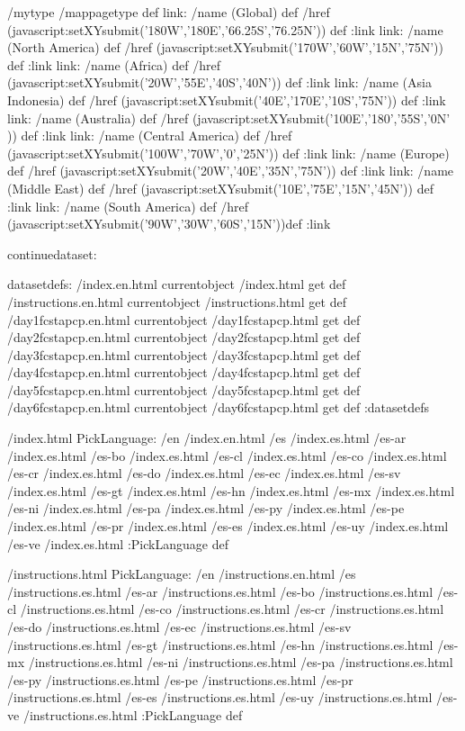 \begin{ingrid}
/mytype /mappagetype def
link:
/name (Global) def
/href (javascript:setXYsubmit('180W','180E','66.25S','76.25N')) def
:link
link:
/name (North America) def
/href (javascript:setXYsubmit('170W','60W','15N','75N')) def
:link
link:
/name (Africa) def
/href (javascript:setXYsubmit('20W','55E','40S','40N')) def
:link
link:
/name (Asia Indonesia) def
/href (javascript:setXYsubmit('40E','170E','10S','75N')) def
:link
link:
/name (Australia) def
/href (javascript:setXYsubmit('100E','180','55S','0N' )) def
:link
link:
/name (Central America) def
/href (javascript:setXYsubmit('100W','70W','0','25N')) def
:link
link:
/name (Europe) def
/href (javascript:setXYsubmit('20W','40E','35N','75N')) def
:link
link:
/name (Middle East) def
/href (javascript:setXYsubmit('10E','75E','15N','45N')) def
:link
link:
/name (South America) def
/href (javascript:setXYsubmit('90W','30W','60S','15N'))def
:link

continuedataset:

datasetdefs:
/index.en.html currentobject /index.html get def
/instructions.en.html currentobject /instructions.html get def
/day1fcstapcp.en.html currentobject /day1fcstapcp.html get def
/day2fcstapcp.en.html currentobject /day2fcstapcp.html get def
/day3fcstapcp.en.html currentobject /day3fcstapcp.html get def
/day4fcstapcp.en.html currentobject /day4fcstapcp.html get def
/day5fcstapcp.en.html currentobject /day5fcstapcp.html get def
/day6fcstapcp.en.html currentobject /day6fcstapcp.html get def
:datasetdefs

/index.html {
PickLanguage:
/en /index.en.html
/es /index.es.html
/es-ar /index.es.html
/es-bo /index.es.html
/es-cl /index.es.html
/es-co /index.es.html
/es-cr /index.es.html
/es-do /index.es.html
/es-ec /index.es.html
/es-sv /index.es.html
/es-gt /index.es.html
/es-hn /index.es.html
/es-mx /index.es.html
/es-ni /index.es.html
/es-pa /index.es.html
/es-py /index.es.html
/es-pe /index.es.html
/es-pr /index.es.html
/es-es /index.es.html
/es-uy /index.es.html
/es-ve /index.es.html
:PickLanguage
} def

/instructions.html {
PickLanguage:
/en /instructions.en.html
/es /instructions.es.html
/es-ar /instructions.es.html
/es-bo /instructions.es.html
/es-cl /instructions.es.html
/es-co /instructions.es.html
/es-cr /instructions.es.html
/es-do /instructions.es.html
/es-ec /instructions.es.html
/es-sv /instructions.es.html
/es-gt /instructions.es.html
/es-hn /instructions.es.html
/es-mx /instructions.es.html
/es-ni /instructions.es.html
/es-pa /instructions.es.html
/es-py /instructions.es.html
/es-pe /instructions.es.html
/es-pr /instructions.es.html
/es-es /instructions.es.html
/es-uy /instructions.es.html
/es-ve /instructions.es.html
:PickLanguage
} def


\end{ingrid}

